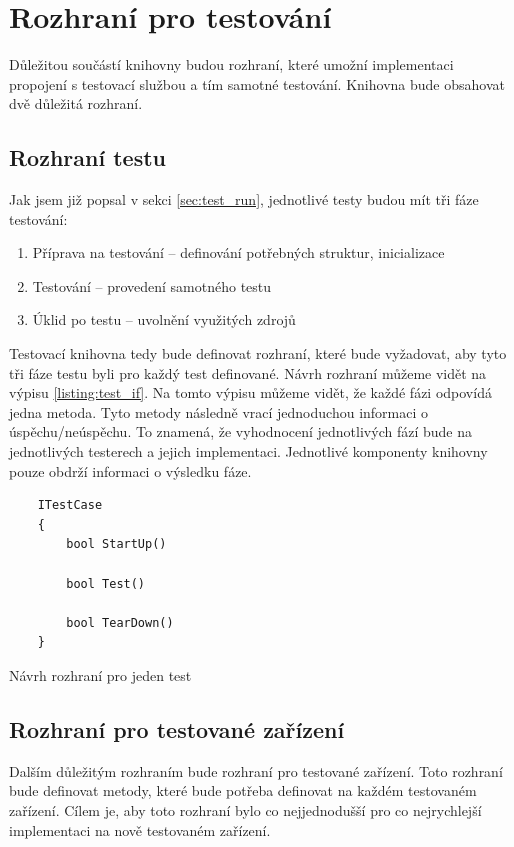 \section{Rozhraní pro testování}
Důležitou součástí knihovny budou rozhraní, které umožní implementaci propojení s testovací službou a tím samotné testování. Knihovna bude obsahovat dvě důležitá rozhraní. 

\subsection{Rozhraní testu}
Jak jsem již popsal v sekci \ref{sec:test_run}, jednotlivé testy budou mít tři fáze testování:

\begin{enumerate}
    \item Příprava na testování -- definování potřebných struktur, inicializace
    \item Testování -- provedení samotného testu
    \item Úklid po testu -- uvolnění využitých zdrojů
\end{enumerate}

Testovací knihovna tedy bude definovat rozhraní, které bude vyžadovat, aby tyto tři fáze testu byli pro každý test definované. Návrh rozhraní můžeme vidět na výpisu \ref{listing:test_if}. Na tomto výpisu můžeme vidět, že každé fázi odpovídá jedna metoda. Tyto metody následně vrací jednoduchou informaci o úspěchu/neúspěchu. To znamená, že vyhodnocení jednotlivých fází bude na jednotlivých testerech a jejich implementaci. Jednotlivé komponenty knihovny pouze obdrží informaci o výsledku fáze.

\begin{listing}[htbp]
    \begin{verbatim}
    ITestCase 
    {
        bool StartUp()

        bool Test()

        bool TearDown()
    }
    \end{verbatim}
\caption{Návrh rozhraní pro jeden test}
\label{listing:test_if}
\end{listing}



\subsection{Rozhraní pro testované zařízení}\label{sec:deviceif}

Dalším důležitým rozhraním bude rozhraní pro testované zařízení. Toto rozhraní bude definovat metody, které bude potřeba definovat na každém testovaném zařízení. Cílem je, aby toto rozhraní bylo co nejjednodušší pro co nejrychlejší implementaci na nově testovaném zařízení.

